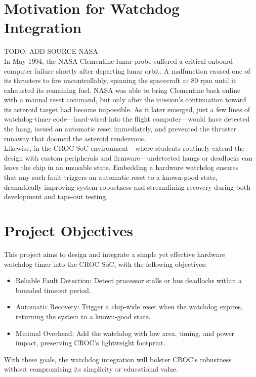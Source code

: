 \section{Motivation for Watchdog Integration}
TODO: ADD SOURCE NASA
\\
In May 1994, the NASA Clementine lunar probe suffered a critical onboard computer failure shortly after departing lunar orbit. A malfunction caused one of its thrusters to fire uncontrollably, spinning the spacecraft at 80 rpm until it exhausted its remaining fuel. NASA was able to bring Clementine back online with a manual reset command, but only after the mission’s continuation toward its asteroid target had become impossible. As it later emerged, just a few lines of watchdog-timer code—hard-wired into the flight computer—would have detected the hang, issued an automatic reset immediately, and prevented the thruster runaway that doomed the asteroid rendezvous.
\\
Likewise, in the CROC SoC environment—where students routinely extend the design with custom peripherals and firmware—undetected hangs or deadlocks can leave the chip in an unusable state. Embedding a hardware watchdog ensures that any such fault triggers an automatic reset to a known-good state, dramatically improving system robustness and streamlining recovery during both development and tape-out testing.

\section{Project Objectives}
This project aims to design and integrate a simple yet effective hardware watchdog timer into the CROC SoC, with the following objectives:
\begin{itemize}
  \item{Reliable Fault Detection:} Detect processor stalls or bus deadlocks within a bounded timeout period.
  \item{Automatic Recovery:} Trigger a chip-wide reset when the watchdog expires, returning the system to a known-good state.
  \item{Minimal Overhead:} Add the watchdog with low area, timing, and power impact, preserving CROC’s lightweight footprint.
\end{itemize}
With these goals, the watchdog integration will bolster CROC’s robustness without compromising its simplicity or educational value.

